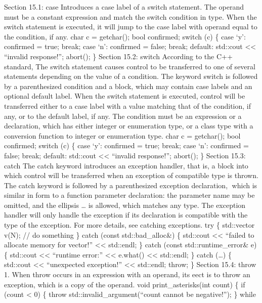 Section 15.1: case Introduces a case label of a switch statement. The
operand must be a constant expression and match the switch condition in
type. When the switch statement is executed, it will jump to the case
label with operand equal to the condition, if any. char c = getchar();
bool confirmed; switch (c) \{ case `y': confirmed = true; break; case
`n': confirmed = false; break; default: std::cout \textless\textless{}
``invalid response!\n''; abort(); \} Section 15.2: switch According to
the C++ standard, The switch statement causes control to be transferred
to one of several statements depending on the value of a condition. The
keyword switch is followed by a parenthesized condition and a block,
which may contain case labels and an optional default label. When the
switch statement is executed, control will be transferred either to a
case label with a value matching that of the condition, if any, or to
the default label, if any. The condition must be an expression or a
declaration, which has either integer or enumeration type, or a class
type with a conversion function to integer or enumeration type. char c =
getchar(); bool confirmed; switch (c) \{ case `y': confirmed = true;
break; case `n': confirmed = false; break; default: std::cout
\textless\textless{} ``invalid response!\n''; abort(); \} Section 15.3:
catch The catch keyword introduces an exception handler, that is, a
block into which control will be transferred when an exception of
compatible type is thrown. The catch keyword is followed by a
parenthesized exception declaration, which is similar in form to a
function parameter declaration: the parameter name may be omitted, and
the ellipsis \ldots{} is allowed, which matches any type. The exception
handler will only handle the exception if its declaration is compatible
with the type of the exception. For more details, see catching
exceptions. try \{ std::vector v(N); // do something \} catch (const
std::bad\_alloc\&) \{ std::cout \textless\textless{} ``failed to
allocate memory for vector!'' \textless\textless{} std::endl; \} catch
(const std::runtime\_error\& e) \{ std::cout \textless\textless{}
``runtime error:'' \textless\textless{} e.what() \textless\textless{}
std::endl; \} catch (\ldots) \{ std::cout \textless\textless{}
``unexpected exception!'' \textless\textless{} std::endl; throw; \}
Section 15.4: throw 1. When throw occurs in an expression with an
operand, its eect is to throw an exception, which is a copy of the
operand. void print\_asterisks(int count) \{ if (count \textless{} 0) \{
throw std::invalid\_argument(``count cannot be negative!''); \} while
